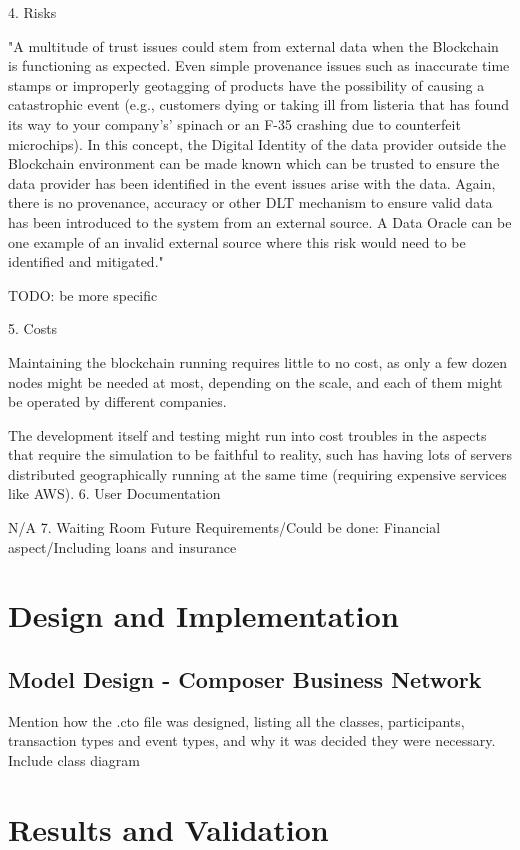 	4. Risks
		\par "A multitude of trust issues could stem from external data when the Blockchain is functioning as expected. Even simple provenance issues such as inaccurate time stamps or improperly geotagging of products have the possibility of causing a catastrophic event (e.g., customers dying or taking ill from listeria that has found its way to your company's’ spinach or an F-35 crashing due to counterfeit microchips). In this concept, the Digital Identity of the data provider outside the Blockchain environment can be made known which can be trusted to ensure the data provider has been identified in the event issues arise with the data. Again, there is no provenance, accuracy or other DLT mechanism to ensure valid data has been introduced to the system from an external source. A Data Oracle can be one example of an invalid external source where this risk would need to be identified and mitigated."
		\par TODO: be more specific
		
	5. Costs
		\par Maintaining the blockchain running requires little to no cost, as only a few dozen nodes might be needed at most, depending on the scale, and each of them might be operated by different companies.
		\par The development itself and testing might run into cost troubles in the aspects that require the simulation to be faithful to reality, such has having lots of servers distributed geographically running at the same time (requiring expensive services like AWS).
	6. User Documentation
		\par N/A
	7. Waiting Room
Future Requirements/Could be done: Financial aspect/Including loans and insurance

\section{Design and Implementation}
\subsection{Model Design - Composer Business Network}
Mention how the .cto file was designed, listing all the classes, participants, transaction types and event types, and why it was decided they were necessary. Include class diagram

\section{Results and Validation}

